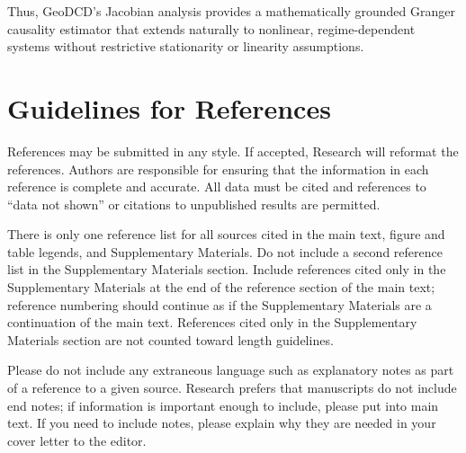 \documentclass{article}
\begin{document}
Thus, GeoDCD's Jacobian analysis provides a mathematically grounded Granger causality estimator that extends naturally to nonlinear, regime-dependent systems without restrictive stationarity or linearity assumptions.


\section*{Guidelines for References}
References may be submitted in any style. If accepted, Research will reformat the references. Authors are responsible for ensuring that the information in each reference is complete and accurate. All data must be cited and references to “data not shown” or citations to unpublished results are permitted.

There is only one reference list for all sources cited in the main text, figure and table legends, and Supplementary Materials. Do not include a second reference list in the Supplementary Materials section. Include references cited only in the Supplementary Materials at the end of the reference section of the main text; reference numbering should continue as if the Supplementary Materials are a continuation of the main text. References cited only in the Supplementary Materials section are not counted toward length guidelines.

Please do not include any extraneous language such as explanatory notes as part of a reference to a given source. Research prefers that manuscripts do not include end notes; if information is important enough to include, please put into main text.  If you need to include notes, please explain why they are needed in your cover letter to the editor.

\printbibliography
\end{document}
